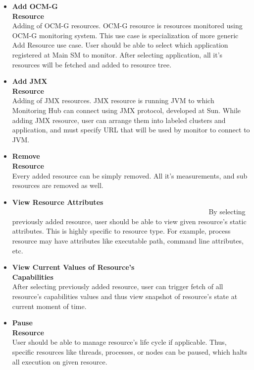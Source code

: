 \begin{itemize}

 \item {\bf Add OCM-G Resource}~~~~~~~~~~~~~~~~~~~~~~~~~~~~~~~~~~~~~~~~~~~~~~~~~~~~~~~~\linebreak
Adding of OCM-G resources. OCM-G resource is resources monitored using OCM-G monitoring system. This use case is
specialization of more generic Add Resource use case. User should be able to select which application registered at Main
SM to monitor. After selecting application, all it's resources will be fetched and added to resource tree.

 \item {\bf Add JMX Resource}~~~~~~~~~~~~~~~~~~~~~~~~~~~~~~~~~~~~~~~~~~~~~~~~~~~~~~~~\linebreak
Adding of JMX resources. JMX resource is running JVM to which Monitoring Hub can connect using JMX protocol, developed
at Sun. While adding JMX resource, user can arrange them into labeled clusters and application, and must specify URL
that will be used by monitor to connect to JVM.

 \item {\bf Remove Resource}~~~~~~~~~~~~~~~~~~~~~~~~~~~~~~~~~~~~~~~~~~~~~~~~~~~~~~~~\linebreak
Every added resource can be simply removed. All it's measurements, and sub resources are removed as well.

 \item {\bf View Resource Attributes} ~~~~~~~~~~~~~~~~~~~~~~~~~~~~~~~~~~~~~~~~~~~~~~~~~~~~~~~~\linebreak
By selecting previously added resource, user should be able to view given resource's static attributes. This is highly
specific to resource type. For example, process resource may have attributes like executable path, command line
attributes, etc.

 \item {\bf View Current Values of Resource's
Capabilities}~~~~~~~~~~~~~~~~~~~~~~~~~~~~~~~~~~~~~~~~~~~~~~~~~~~~~~~~\linebreak
After selecting previously added resource, user can trigger fetch of all resource's capabilities values and thus view
snapshot of resource's state at current moment of time.

 \item {\bf Pause Resource}~~~~~~~~~~~~~~~~~~~~~~~~~~~~~~~~~~~~~~~~~~~~~~~~~~~~~~~~\linebreak
User should be able to manage resource's life cycle if applicable. Thus, specific resources like threads, processes, or
nodes can be paused, which halts all execution on given resource.


\end{itemize}
